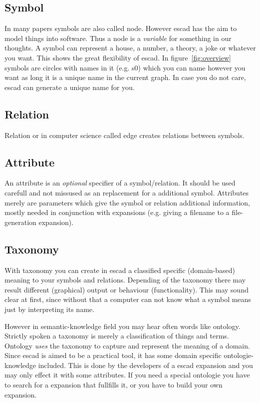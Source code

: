 \documentclass[a4paper, 12pt, openany]{scrbook}
\begin{document}
\subsection{Symbol}
In many papers symbols are also called node. However escad has the aim to model things into software. Thus a node is a \emph{variable} for something in our thoughts. A symbol can represent a house, a number, a theory, a joke or whatever you want. This shows the great flexibility of escad. In figure~\ref{fig:overview} symbols are circles with names in it (e.g. s0) which you can name however you want as long it is a unique name in the current graph. In case you do not care, escad can generate a unique name for you.
\subsection{Relation}
Relation or in computer science called edge creates relations between symbols.
\subsection{Attribute}
An attribute is an \emph{optional} specifier of a symbol/relation. It should be used carefull and not missused as an replacement for a additional symbol. Attributes merely are parameters which give the symbol or relation additional information, mostly needed in conjunction with expansions (e.g. giving a filename to a file-generation expansion).
\subsection{Taxonomy}
With taxonomy you can create in escad a classified specific (domain-based) meaning to your symbols and relations. Depending of the taxonomy there may result different (graphical) output or behaviour (functionality). This may sound clear at first, since without that a computer can not know what a symbol means just by interpreting its name.

However in semantic-knowledge field you may hear often words like ontology. Strictly spoken a taxonomy is merely a classification of things and terms. Ontology \emph{uses} the taxonomy to capture and represent the meaning of a domain. Since escad is aimed to be a practical tool, it has some domain specific ontologie-knowledge included. This is done by the developers of a escad expansion and you may only effect it with some attributes. If you need a special ontologie you have to search for a expansion that fullfills it, or you have to build your own expansion.
\end{document}
